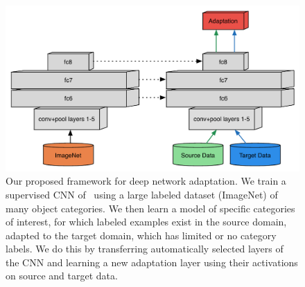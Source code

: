 \newcommand{\svmT}{\bm{\theta}}
\newcommand{\svmB}{b}
\newcommand{\svmAug}{\tilde{\svmT}}
\newcommand{\svmAugAll}{\bm{\Theta}}


\begin{figure}
\begin{center}
\includegraphics[width=.6\linewidth]{figs/model-adapt}
\end{center}
\caption{Our proposed framework for deep network adaptation. We train a supervised CNN of~\cite{supervision} using a large labeled dataset (ImageNet) of many object categories. We then learn a model of specific categories of interest, for which labeled examples exist in the source domain, adapted to the target domain, which has limited or no category labels. We do this by transferring automatically selected layers of the CNN and learning a new adaptation layer using their activations on source and target data.}
\label{fig:model-adapt}
\end{figure}

